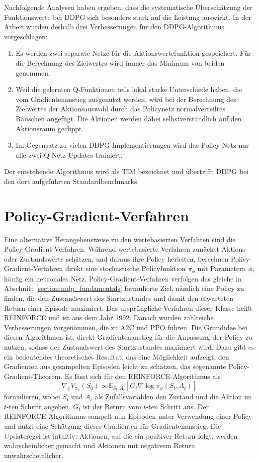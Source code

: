 Nachfolgende Analysen haben ergeben, dass die systematische Überschätzung der Funktionswerte bei DDPG sich besonders stark auf die Leistung auswirkt.
In der Arbeit \cite{DBLP:journals/corr/abs-1802-09477} wurden deshalb drei Verbesserungen für den DDPG-Algorithmus vorgeschlagen:
\begin{enumerate}
	\item Es werden zwei separate Netze für die Aktionswertefunktion gespeichert.
	Für die Berechnung des Zielwertes wird immer das Minimum von beiden genommen.
	\item Weil die gelernten Q-Funktionen teils lokal starke Unterschiede haben, die vom Gradientenanstieg ausgenutzt werden, wird bei der Berechnung des Zielwertes der Aktionsauswahl durch das Policynetz normalverteiltes Rauschen angefügt.
	Die Aktionen werden dabei selbstverständlich auf den Aktionsraum geclippt.
	\item Im Gegensatz zu vielen DDPG-Implementierungen wird das Policy-Netz nur alle zwei Q-Netz-Updates trainiert.
\end{enumerate}
Der entstehende Algorithmus wird als TD3 bezeichnet und übertrifft DDPG bei den dort aufgeführten Standardbenchmarks.

\section{Policy-Gradient-Verfahren}
Eine alternative Herangehensweise zu den wertebasierten Verfahren sind die Policy-Gradient-Verfahren.
Während wertebasierte Verfahren zunächst Aktions- oder Zustandswerte schätzen, und daraus ihre Policy herleiten, berechnen Policy-Gradient-Verfahren direkt eine stochastische Policyfunktion $\pi_\phi$ mit Parametern $\phi$, häufig ein neuronales Netz.
Policy-Gradient-Verfahren verfolgen das gleiche in Abschnitt \ref{section:mdp_fundamentals} formulierte Ziel, nämlich eine Policy zu finden, die den Zustandswert des Startzustandes und damit den erwarteten Return einer Episode maximiert.
Das ursprüngliche Verfahren dieser Klasse heißt REINFORCE \cite{10.1007/BF00992696} und ist aus dem Jahr 1992.
Danach wurden zahlreiche Verbesserungen vorgenommen, die zu A2C und PPO führen.
Die Grundidee bei diesen Algorithmen ist, direkt Gradientenanstieg für die Anpassung der Policy zu nutzen, sodass der Zustandswert des Startzustandes maximiert wird.
Dazu gibt es ein bedeutendes theoretisches Resultat, das eine Möglichkeit aufzeigt, den Gradienten aus gesampelten Episoden leicht zu schätzen, das sogenannte Policy-Gradient-Theorem.
Es lässt sich für den REINFORCE-Algorithmus als
\begin{equation}
	\nabla_\phi V_{\pi_\phi}(S_0) \propto \mathbb{E}_{S_t, A_t}\left[G_t \nabla\log{\pi_\phi(S_t, A_t)}\right]
\end{equation}
formulieren, wobei $S_t$ und $A_t$ als Zufallsvariablen den Zustand und die Aktion im $t$-ten Schritt angeben.
$G_t$ ist der Return vom $t$-ten Schritt aus.
Der REINFORCE-Algorithmus sampelt nun Episoden unter Verwendung einer Policy und nutzt eine Schätzung dieses Gradienten für Gradientenanstieg.
Die Updateregel ist intuitiv: Aktionen, auf die ein positiver Return folgt, werden wahrscheinlicher gemacht und Aktionen mit negativem Return unwahrscheinlicher.

